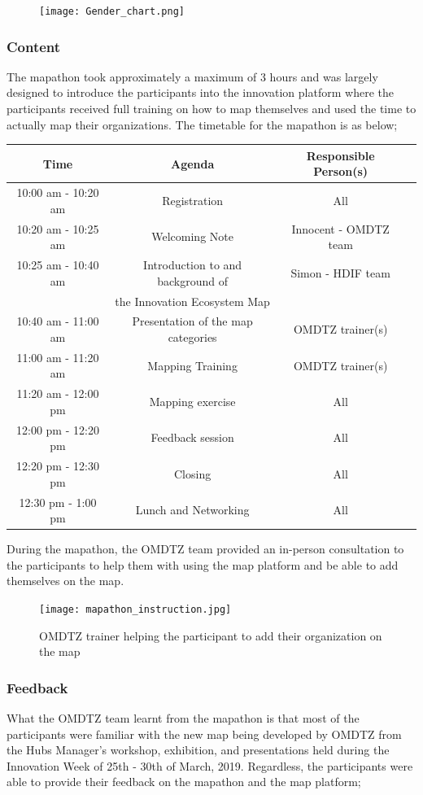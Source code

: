 \documentclass[a4paper,12pt,twoside]{article}
\begin{document}
\begin{figure}[h]
	\centering
	\texttt{[image: Gender\_chart.png]}
\end{figure}

\subsubsection{Content}
The mapathon took approximately a maximum of 3 hours and was largely designed to introduce the participants into the innovation platform where the participants received full training on how to map themselves and used the time to actually map their organizations. The timetable for the mapathon is as below;

\begin{tabular}{|c|c|c|c|}
	\hline
	\rowcolor{Gray}
	\bfseries Time & Agenda & Responsible Person(s)\\
	\hline
	10:00 am - 10:20 am & Registration & All\\
	\hline
	10:20 am - 10:25 am & Welcoming Note & Innocent - OMDTZ team\\
	\hline
	10:25 am - 10:40 am & Introduction to and background of & Simon - HDIF team\\
	{} &  the Innovation Ecosystem Map & {}\\
	\hline
	10:40 am - 11:00 am	& Presentation of the map categories & OMDTZ trainer(s)\\
	\hline
	11:00 am - 11:20 am & Mapping Training & OMDTZ trainer(s)\\
	\hline
	11:20 am - 12:00 pm & Mapping exercise & All\\
	\hline
	12:00 pm - 12:20 pm & Feedback session & All\\
	\hline
	12:20 pm - 12:30 pm & Closing & All\\
	\hline
	12:30 pm - 1:00 pm & Lunch and Networking & All\\
	\hline
\end{tabular}

During the mapathon, the OMDTZ team provided an in-person consultation to the participants to help them with using the map platform and be able to add themselves on the map.
\begin{figure}
	\centering
	\texttt{[image: mapathon\_instruction.jpg]}
	\caption{OMDTZ trainer helping the participant to add their organization on the map}
\end{figure}

\subsubsection{Feedback}
What the OMDTZ team learnt from the mapathon is that most of the participants were familiar with the new map being developed by OMDTZ from the Hubs Manager’s workshop, exhibition, and presentations held during the Innovation Week of 25th - 30th of March, 2019. Regardless, the participants were able to provide their feedback on the mapathon and the map platform;
\end{document}
